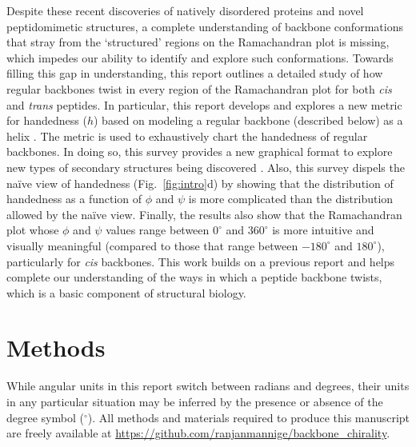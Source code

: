 \documentclass[fleqn,10pt,lineno]{wlpeerj} %
\newcommand{\n}[1]{{\color{black}#1}} %
\newcommand{\Fig}[1]{Fig.~\ref{#1}}
\newcommand{\h}{h}
\newcommand{\cis}{{\em{cis}}\xspace}
\newcommand{\trans}{{\em{trans}}\xspace}
\begin{document}
Despite these recent discoveries of natively disordered proteins and novel peptidomimetic structures, a complete understanding of backbone conformations that stray from the `structured' regions on the Ramachandran plot is missing, which impedes our ability to identify and explore such conformations. Towards filling this gap in understanding, this report outlines a detailed study of how regular backbones twist in every region of the Ramachandran plot \n{for both \cis and \trans peptides}. In particular, this report develops and explores a new metric for handedness ($\h$) based on modeling a regular backbone (described below) as a helix \citep{Shimanouchi1955,Miyazawa1961,Zacharias2013}. The metric is used to exhaustively chart the handedness of regular backbones. In doing so, this survey provides a new graphical format to explore new types of secondary structures being discovered \citep{Mannige2015,Gorske2016}\n{. Also, this survey dispels} the na{\"i}ve view of handedness (\Fig{fig:intro}d) by showing that the distribution of handedness as a function of $\phi$ and $\psi$ is more complicated than the distribution allowed by the na{\"i}ve view. Finally, the results also show that the Ramachandran plot whose $\phi$ and $\psi$ values range between $0^\circ$ and $360^\circ$ is more intuitive and visually meaningful (compared to those that range between $-180^\circ$ and $180^\circ$), particularly for \cis backbones. \n{T}his work builds on a previous report \citep{Zacharias2013} and helps complete our understanding of the ways in which a peptide backbone twists, which is a basic component of structural biology.

\section*{Methods}
While angular units in this report switch between radians and degrees, their units in any particular situation may be inferred by the presence or absence of the degree symbol ($^\circ$). All methods and materials required to produce this manuscript are freely available at \url{https://github.com/ranjanmannige/backbone_chirality}.
\end{document}
